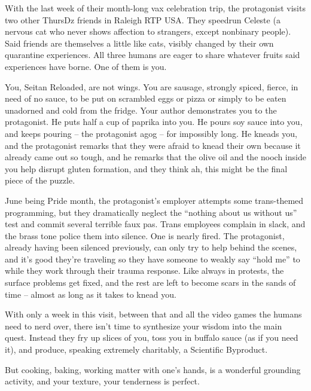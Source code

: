 \documentclass[12pt]{article}
\begin{document}
With the last week of their month-long vax celebration trip,
the protagonist visits two other ThursDz friends in Raleigh RTP USA.
They speedrun Celeste (a nervous cat who never shows affection to strangers, except nonbinary people).
Said friends are themselves a little like cats, visibly changed by their own quarantine experiences.
All three humans are eager to share whatever fruits said experiences have borne.
One of them is you.

You, Seitan Reloaded, are not wings.
You are sausage, strongly spiced, fierce, in need of no sauce,
to be put on scrambled eggs or pizza or simply to be eaten unadorned and cold from the fridge.
Your author demonstrates you to the protagonist.
He puts half a cup of paprika into you.
He pours soy sauce into you, and keeps pouring -- the protagonist agog -- for impossibly long.
He kneads you,
and the protagonist remarks that they were afraid to knead their own because it already came out so tough,
and he remarks that the olive oil and the nooch inside you help disrupt gluten formation,
and they think ah, this might be the final piece of the puzzle.

June being Pride month,
the protagonist's employer attempts some trans-themed programming,
but they dramatically neglect the ``nothing about us without us'' test
and commit several terrible faux pas.
Trans employees complain in slack,
and the brass tone police them into silence.
One is nearly fired.
The protagonist, already having been silenced previously,
can only try to help behind the scenes,
and it's good they're traveling so they have someone to weakly say ``hold me'' to
while they work through their trauma response.
Like always in protests, the surface problems get fixed, and the rest are left to become scars in the sands of time -- almost as long as it takes to knead you.

With only a week in this visit, between that and all the video games the humans need to nerd over, there isn't time to synthesize your wisdom into the main quest.
Instead they fry up slices of you, toss you in buffalo sauce (as if you need it),
and produce, speaking extremely charitably, a Scientific Byproduct.

But cooking, baking, working matter with one's hands, is a wonderful grounding activity,
and your texture, your tenderness is perfect.

\end{document}
